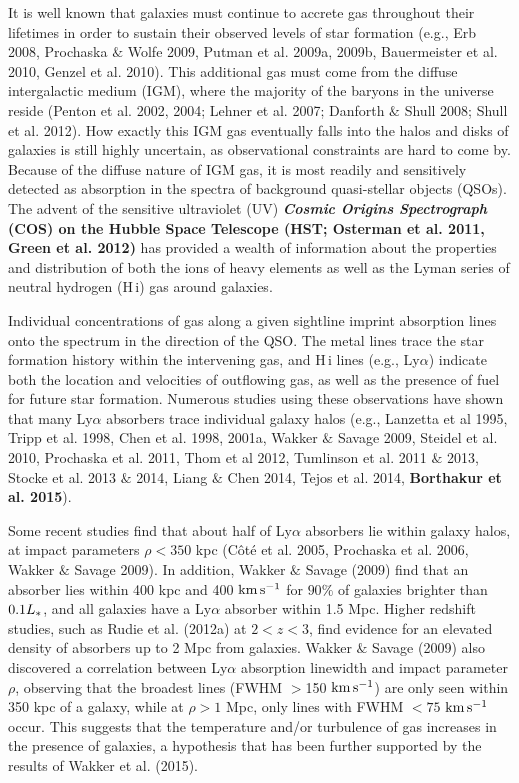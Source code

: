 \documentclass[twocolumn,tighten]{aastex6}
\begin{document}
It is well known that galaxies must continue to accrete gas throughout their lifetimes in order to sustain their observed levels of star formation (e.g., Erb 2008, Prochaska $\&$ Wolfe 2009, Putman et al. 2009a, 2009b, Bauermeister et al. 2010, Genzel et al. 2010). This additional gas must come from the diffuse intergalactic medium (IGM), where the majority of the baryons in the universe reside (Penton et al. 2002, 2004; Lehner et al. 2007; Danforth $\&$ Shull 2008; Shull et al. 2012). How exactly this IGM gas eventually falls into the halos and disks of galaxies is still highly uncertain, as observational constraints are hard to come by. Because of the diffuse nature of IGM gas, it is most readily and sensitively detected as absorption in the spectra of background quasi-stellar objects (QSOs). The advent of the sensitive ultraviolet (UV) \textbf{\textit{Cosmic Origins Spectrograph} (COS) on the Hubble Space Telescope (HST; Osterman et al. 2011, Green et al. 2012)} has provided a wealth of information about the properties and distribution of both the ions of heavy elements as well as the Lyman series of neutral hydrogen (H\,{\sc i}) gas around galaxies. 

Individual concentrations of gas along a given sightline imprint absorption lines onto the spectrum in the direction of the QSO. The metal lines trace the star formation history within the intervening gas, and H\,{\sc i} lines (e.g., Ly$\alpha$) indicate both the location and velocities of outflowing gas, as well as the presence of fuel for future star formation. Numerous studies using these observations have shown that many Ly$\alpha$ absorbers trace individual galaxy halos (e.g., Lanzetta et al 1995, Tripp et al. 1998, Chen et al. 1998, 2001a, Wakker $\&$ Savage 2009, Steidel et al. 2010, Prochaska et al. 2011, Thom et al 2012, Tumlinson et al. 2011 $\&$ 2013, Stocke et al. 2013 $\&$ 2014, Liang $\&$ Chen 2014, Tejos et al. 2014, \textbf{Borthakur et al. 2015}).

Some recent studies find that about half of Ly$\alpha$ absorbers lie within galaxy halos, at impact parameters $\rho<350$ kpc (C\^{o}t\'{e} et al. 2005, Prochaska et al. 2006, Wakker $\&$ Savage 2009). In addition, Wakker $\&$ Savage (2009) find that an absorber lies within 400 kpc and 400 $\rm km\, s^{-1}$ for $90\%$ of galaxies brighter than $0.1L_{\**}$, and all galaxies have a Ly$\alpha$ absorber within 1.5 Mpc. Higher redshift studies, such as Rudie et al. (2012a) at $2<z<3$, find evidence for an elevated density of absorbers up to 2 Mpc from galaxies. Wakker $\&$ Savage (2009) also discovered a correlation between Ly$\alpha$ absorption linewidth and impact parameter $\rho$, observing that the broadest lines (FWHM $>$150 $\rm km\, s^{-1}$) are only seen within 350 kpc of a galaxy, while at $\rho>1$ Mpc, only lines with FWHM $<75$ $\rm km\, s^{-1}$ occur. This suggests that the temperature and/or turbulence of gas increases in the presence of galaxies, a hypothesis that has been further supported by the results of Wakker et al. (2015). 
\end{document}
